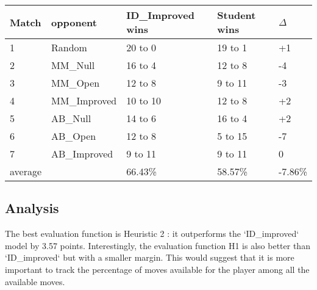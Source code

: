 \documentclass[12pt]{article}
\begin{document}
\begin{table}[H]
\begin{tabular}{|l|l|l|l|l|}
\hline
Match & opponent & ID\_Improved wins & Student wins & $\Delta$\\
\hline
 1 & Random    &	20 to 0 & 19 to 1 & +1\\
 \hline
  2 & MM\_Null   &	16 to 4 & 12 to 8 & -4\\
  \hline
  3 &  MM\_Open  & 	12 to 8 & 9 to 11 & -3\\
  \hline
  4 &MM\_Improved &	10 to 10 & 12 to 8 & +2 \\
  \hline
  5 & AB\_Null   & 14 to 6 & 16 to 4 & +2\\
  \hline 
  6 & AB\_Open  & 	12 to 8 & 5 to 15 & -7\\
  \hline
  7 & AB\_Improved & 9 to 11 & 9 to 11 & 0\\
  \hline
  average & & 66.43\% & 58.57\% & -7.86\%\\
  \hline
\end{tabular}
\end{table}

\subsection{Analysis}
The best evaluation function is Heuristic 2 : it outperforms the `ID\_improved` model by 3.57 points. Interestingly, the evaluation function H1 is also better than `ID\_improved` but with a smaller margin. This would suggest that it is more important to track the percentage of moves available for the player among all the available moves. 
\end{document}
